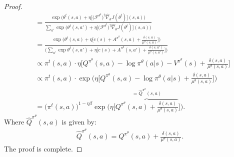 \begin{proof}
\begin{align*}
            &= \frac{  
                \exp \Bigg( \theta^{t}(s,a) + \eta \Big[ \bigl(\mathcal{F}^{\theta^t}\bigr)^\dagger \hat{\nabla}_\theta J(\theta^t) \Big](s,a) \Bigg)  }{
                    \sum_{a'} \exp \Bigg( \theta^{t}(s,a') + \eta \Big[ \bigl(\mathcal{F}^{\theta^t}\bigr)^\dagger \hat{\nabla}_\theta J(\theta^t) \Big](s,a) \Bigg) } \\
            &= \frac{  
                \exp \Bigg( \theta^{t}(s,a) + \eta \Big[ c(s) + A^{\pi^\theta}(s,a) + \frac{\delta(s,a)}{\mu^\theta(s,a)} \Big]  \Bigg) }{ \Bigg( 
                    \sum_{a'} \exp \theta^{t}(s,a') + \eta \Big[  c(s) + A^{\pi^\theta}(s,a') + \frac{\delta(s,a')}{\mu^\theta(s,a')} \Big] \Bigg) } \\
            &\propto \pi^{t}(s,a) \cdot
                \eta \Big[ Q^{\pi^\theta}(s,a) - \log \pi^\theta(a|s) - V^{\pi^\theta}(s) + \frac{\delta(s,a)}{\mu^\theta(s,a)} \Big]   \\
            &\propto \pi^{t}(s,a) \cdot \exp \Bigg( 
                \eta \Big[ Q^{\pi^\theta}(s,a) - \log \pi^\theta(a|s) + \frac{\delta(s,a)}{\mu^\theta(s,a)} \Big] \Bigg)  \\
            &=  \Big( \pi^{t}(s,a) \Big)^{1-\eta \beta}  \exp \Bigg( 
                \eta \Big[ \overbrace{Q^{\pi^\theta}(s,a)  + \frac{\delta(s,a)}{\mu^\theta(s,a)}}^{=\hat{Q}^{\pi^\theta}(s,a)} \Big] \Bigg).
        \end{align*}
        Where $\hat{Q}^{\pi^\theta}(s,a)$ is given by:
        \begin{align*}
            \hat{Q}^{\pi^\theta}(s,a) = Q^{\pi^\theta}(s,a)  + \frac{\delta(s,a)}{\mu^\theta(s,a)}.
        \end{align*}
        The proof is complete.
\end{proof}